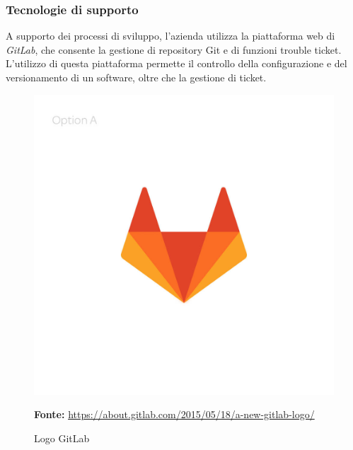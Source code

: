 \subsubsection{Tecnologie di supporto}
A supporto dei processi di sviluppo, l'azienda utilizza la piattaforma web di \textit{GitLab}, che consente la gestione di repository Git e di funzioni trouble ticket.\\
L'utilizzo di questa piattaforma permette il controllo della configurazione e del versionamento di un software, oltre che la gestione di ticket.

\begin{figure}[H]
	\begin{center}
	\includegraphics[scale=0.15]{immagini/gitlab.jpg}
	\caption{Logo GitLab}
	\small{\textbf{Fonte:} \url{https://about.gitlab.com/2015/05/18/a-new-gitlab-logo/}}
	\end{center}
\end{figure}

